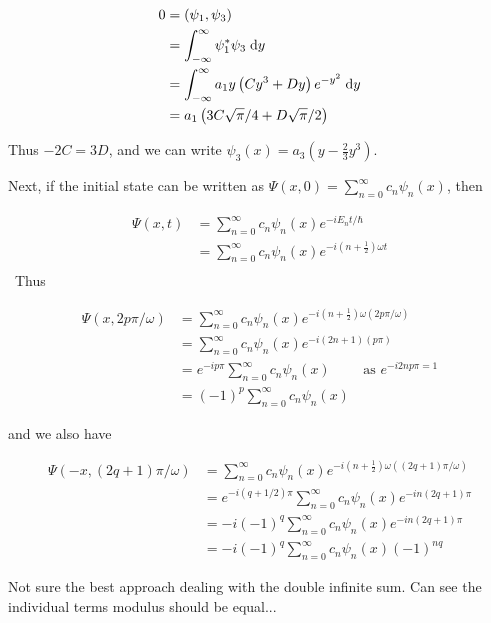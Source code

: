 \documentclass[a4paper]{article}
\begin{document}
\begin{align*}
0 & = (\psi_{1},\psi_{3}) \\
& = \int_{- \infty}^{\infty} \psi_{1}^{*} \psi_{3} \; \mathrm{d} y  \\
& = \int_{- \infty}^{\infty} a_{1} y \left( Cy^{3} + D y \right)e^{- y^{2}}    \; \mathrm{d} y \\
& = a_{1} \left( 3 C   \sqrt{\pi}/4 + D \sqrt{\pi}/2  \right) 
\end{align*}


Thus $ -2C = 3 D $, and we can write $ \psi_{3}(x) = a_{3}( y - \frac{2}{3} y^{3} ) $. 

Next, if the initial state can be written as $ \Psi(x,0) = \sum_{n=0}^{\infty} c_{n} \psi_{n}(x)  $, then

\begin{align*}
\Psi(x,t) & = \sum_{n=0}^{\infty} c_{n} \psi_{n}(x) e^{-iE_{n}t / \hbar} \\
& = \sum_{n=0}^{\infty} c_{n} \psi_{n}(x) e^{-i(n + \frac{1}{2}) \omega t} \\
\end{align*}\
Thus

\begin{align*}
\Psi(x,2p \pi / \omega)  & = \sum_{n=0}^{\infty} c_{n} \psi_{n}(x) e^{-i(n + \frac{1}{2}) \omega ( 2 p \pi / \omega  ) }   \\
& = \sum_{n=0}^{\infty} c_{n} \psi_{n}(x) e^{-i(2n + 1)( p \pi )} \\
& = e^{-i p \pi } \sum_{n=0}^{\infty} c_{n} \psi_{n}(x) \qquad  \text{ as } e^{-i 2n p  \pi = 1} \\
& = (-1)^{p}  \sum_{n=0}^{\infty} c_{n} \psi_{n}(x)
\end{align*}


and we also have 

\begin{align*}
\Psi(-x,(2q + 1) \pi / \omega)  & = \sum_{n=0}^{\infty} c_{n} \psi_{n}(x) e^{-i(n + \frac{1}{2}) \omega ( (2q + 1) \pi / \omega  ) }   \\
& =  e^{-i(q + 1/2) \pi } \sum_{n=0}^{\infty} c_{n} \psi_{n}(x) e^{-i n(2 q + 1) \pi } \\
& = -i(-1)^{q} \sum_{n=0}^{\infty} c_{n} \psi_{n}(x) e^{-i n(2 q + 1) \pi }  \\
& = -i(-1)^{q} \sum_{n=0}^{\infty} c_{n} \psi_{n}(x) (-1)^{nq}
\end{align*}

Not sure the best approach dealing with the double infinite sum. Can see the individual terms modulus should be equal...
\end{document}
